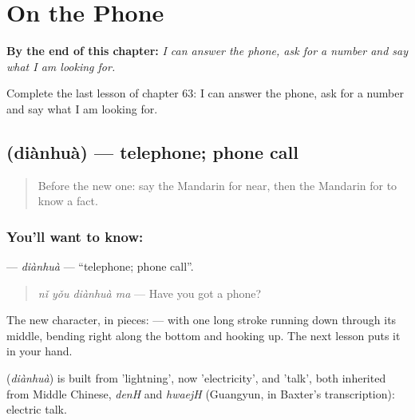 
\chapter{On the Phone}
\label{ch:zh-on-the-phone}

\begin{chapteropening}
\textbf{By the end of this chapter:} \emph{I can answer the phone, ask for a number and say what I am looking for.}

Complete the last lesson of chapter 63: I can answer the phone, ask for a number and say what I am looking for.
\end{chapteropening}

\section[\texorpdfstring{\zh{电话} (diànhuà)}{电话 (diànhuà)}]{ (diànhuà) — telephone; phone call}

\label{lesson:ZH-C63-dianhua}



\begin{quote}
Before the new one: say the Mandarin for near, then the Mandarin for to know a fact.
\end{quote}

\subsection*{You'll want to know: }
\textbf{} — \emph{diànhuà} — \textquotedblleft{}telephone; phone call\textquotedblright{}.

\begin{quote}
\textbf{} \emph{nǐ yǒu diànhuà ma} — Have you got a phone?
\end{quote}

The new character, in pieces:  —  with one long stroke running down through its middle, bending right along the bottom and hooking up. The next lesson puts it in your hand.

\begin{cousinweb}
\textbf{} (\emph{diànhuà}) is built from  'lightning', now 'electricity', and  'talk', both inherited from Middle Chinese, \emph{denH} and \emph{hwaejH} (Guangyun, in Baxter's transcription): electric talk.
\end{cousinweb}

